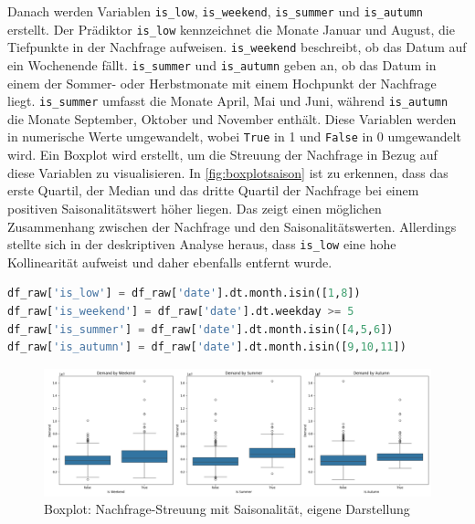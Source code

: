 \noindent
Danach werden Variablen \verb|is_low|, \verb|is_weekend|, \verb|is_summer| und \verb|is_autumn| erstellt. Der Prädiktor \verb|is_low| kennzeichnet die Monate Januar und August, die Tiefpunkte in der Nachfrage aufweisen. \verb|is_weekend| beschreibt, ob das Datum auf ein Wochenende fällt. \verb|is_summer| und \verb|is_autumn| geben an, ob das Datum in einem der Sommer- oder Herbstmonate mit einem Hochpunkt der Nachfrage liegt. \verb|is_summer| umfasst die Monate April, Mai und Juni, während \verb|is_autumn| die Monate September, Oktober und November enthält. Diese Variablen werden in numerische Werte umgewandelt, wobei \verb|True| in 1 und \verb|False| in 0 umgewandelt wird. Ein Boxplot wird erstellt, um die Streuung der Nachfrage in Bezug auf diese Variablen zu visualisieren. In \autoref{fig:boxplotsaison} ist zu erkennen, dass das erste Quartil, der Median und das dritte Quartil der Nachfrage bei einem positiven Saisonalitätswert höher liegen. Das zeigt einen möglichen Zusammenhang zwischen der Nachfrage und den Saisonalitätswerten. Allerdings stellte sich in der deskriptiven Analyse heraus, dass \verb|is_low| eine hohe Kollinearität aufweist und daher ebenfalls entfernt wurde.
\begin{lstlisting}[language=Python, linewidth=\textwidth]
df_raw['is_low'] = df_raw['date'].dt.month.isin([1,8])
df_raw['is_weekend'] = df_raw['date'].dt.weekday >= 5  
df_raw['is_summer'] = df_raw['date'].dt.month.isin([4,5,6])  
df_raw['is_autumn'] = df_raw['date'].dt.month.isin([9,10,11]) 
\end{lstlisting}
\begin{figure}[H]
    \centering
    \includegraphics[width=1\linewidth]{images/boxplot.png}
    \caption{Boxplot: Nachfrage-Streuung mit Saisonalität, eigene Darstellung}
    \label{fig:boxplotsaison}
\end{figure}
